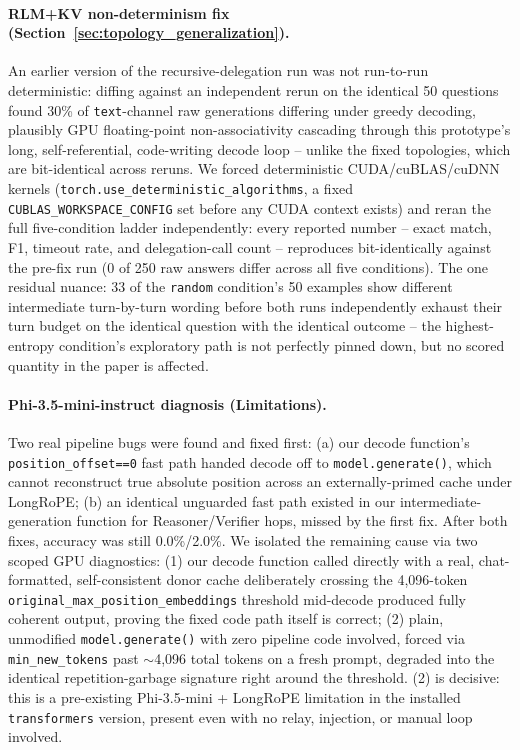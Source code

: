 \documentclass[11pt]{article}
\begin{document}
\paragraph{RLM+KV non-determinism fix (Section~\ref{sec:topology_generalization}).}
An earlier version of the recursive-delegation run was not run-to-run
deterministic: diffing against an independent rerun on the identical 50
questions found 30\% of \texttt{text}-channel raw generations differing
under greedy decoding, plausibly GPU floating-point non-associativity
cascading through this prototype's long, self-referential, code-writing
decode loop -- unlike the fixed topologies, which are bit-identical
across reruns. We forced deterministic CUDA/cuBLAS/cuDNN kernels
(\texttt{torch.use\_deterministic\_algorithms}, a fixed
\texttt{CUBLAS\_WORKSPACE\_CONFIG} set before any CUDA context exists) and
reran the full five-condition ladder independently: every reported
number -- exact match, F1, timeout rate, and delegation-call count --
reproduces bit-identically against the pre-fix run (0 of 250 raw answers
differ across all five conditions). The one residual nuance: 33 of the
\texttt{random} condition's 50 examples show different intermediate
turn-by-turn wording before both runs independently exhaust their turn
budget on the identical question with the identical outcome -- the
highest-entropy condition's exploratory path is not perfectly pinned
down, but no scored quantity in the paper is affected.

\paragraph{Phi-3.5-mini-instruct diagnosis (Limitations).}
Two real pipeline bugs were found and fixed first: (a) our decode
function's \texttt{position\_offset==0} fast path handed decode off to
\texttt{model.generate()}, which cannot reconstruct true absolute
position across an externally-primed cache under LongRoPE; (b) an
identical unguarded fast path existed in our intermediate-generation
function for Reasoner/Verifier hops, missed by the first fix. After both
fixes, accuracy was still 0.0\%/2.0\%. We isolated the remaining cause
via two scoped GPU diagnostics: (1) our decode function called directly
with a real, chat-formatted, self-consistent donor cache deliberately
crossing the 4,096-token \texttt{original\_max\_position\_embeddings}
threshold mid-decode produced fully coherent output, proving the fixed
code path itself is correct; (2) plain, unmodified
\texttt{model.generate()} with zero pipeline code involved, forced via
\texttt{min\_new\_tokens} past $\sim$4,096 total tokens on a fresh
prompt, degraded into the identical repetition-garbage signature right
around the threshold. (2) is decisive: this is a pre-existing
Phi-3.5-mini + LongRoPE limitation in the installed \texttt{transformers}
version, present even with no relay, injection, or manual loop involved.
\end{document}

